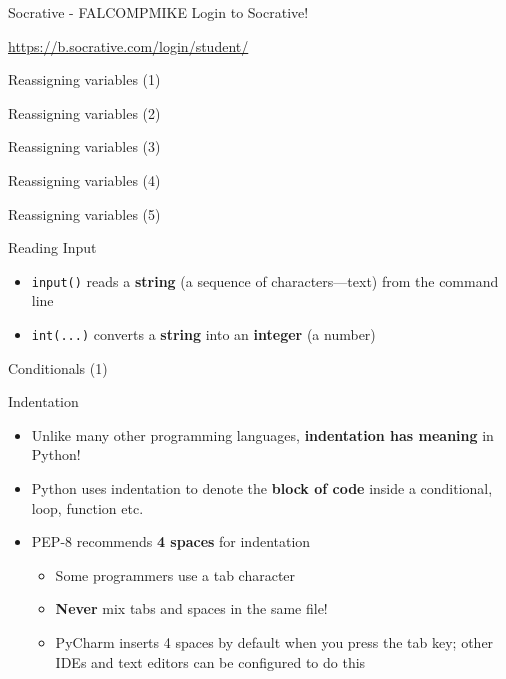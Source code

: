 \begin{frame}{Socrative - FALCOMPMIKE}
Login to Socrative!

\vspace{1em}

\url{https://b.socrative.com/login/student/}

\end{frame}

\begin{frame}{Reassigning variables (1)}
\end{frame}

\begin{frame}{Reassigning variables (2)}
\end{frame}

\begin{frame}{Reassigning variables (3)}
\end{frame}

\begin{frame}{Reassigning variables (4)}
\end{frame}

\begin{frame}{Reassigning variables (5)}
\end{frame}

\begin{frame}{Reading Input}

\begin{itemize}
\item \lstinline{input()} reads a \textbf{string} (a sequence of characters---text) from the command line
\item \lstinline{int(...)} converts a \textbf{string} into an \textbf{integer} (a number)
\end{itemize}
\end{frame}

\begin{frame}{Conditionals (1)}
\end{frame}

\begin{frame}{Indentation}
\begin{itemize}
\item Unlike many other programming languages, \textbf{indentation has meaning} in Python!
\item Python uses indentation to denote the \textbf{block of code} inside a conditional, loop, function etc.
\item PEP-8 recommends \textbf{4 spaces} for indentation
\begin{itemize}
\item Some programmers use a tab character
\item \textbf{Never} mix tabs and spaces in the same file!
\item PyCharm inserts 4 spaces by default when you press the tab key;
other IDEs and text editors can be configured to do this
\end{itemize}
\end{itemize}
\end{frame}

